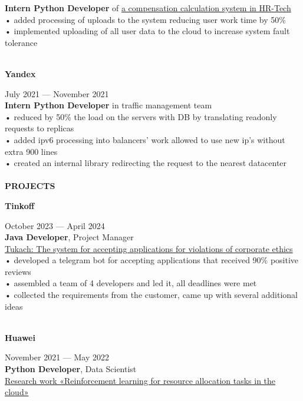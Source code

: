 \documentclass{article}
\begin{document}
\begin{vwcol}[widths={0.8,0.2},
 sep=.8cm, justify=flush,rule=0pt,indent=1em]
\textbf{Intern Python Developer} of \href{https://yandex.cloud/ru/isv/hrtech}{a compensation calculation system in HR-Tech}\\
• added processing of uploads to the system reducing user work time by 50\%\\
• implemented uploading of all user data to the cloud to increase system fault tolerance\\
\\
\begin{Large}
\textbf{Yandex}
\end{Large}
\hspace{247pt}July 2021 — November 2021\\
\textbf{Intern Python Developer} in traffic management team\\
• reduced by 50\% the load on the servers with DB by translating readonly requests to replicas\\
• added ipv6 processing into balancers’ work allowed to use new ip’s without extra 900 lines\\
• created an internal library redirecting the request to the nearest datacenter\\
\\
\noindent\textcolor[rgb]{0.1255,0.2902,0.7843}{\textbf{\Large{PROJECTS}}}\\
\begin{Large}
\textbf{Tinkoff}
\end{Large}
\hspace{257pt}October 2023 — April 2024\\
\textbf{Java Developer}, Project Manager\\
\href{https://github.com/NikPeg/TukachBot}{Tukach: The system for accepting applications for violations of corporate ethics}\\
• developed a telegram bot for accepting applications that received 90\% positive reviews\\
• assembled a team of 4 developers and led it, all deadlines were met\\
• collected the requirements from the customer, came up with several additional ideas\\
\\
\begin{Large}
\textbf{Huawei}
\end{Large}
\hspace{247pt}November 2021 — May 2022\\
\textbf{Python Developer}, Data Scientist\\
\href{https://github.com/NikPeg/Reinforcement-learning-for-resource-allocation-tasks-in-the-cloud}{Research work «Reinforcement learning for resource allocation tasks in the cloud»}\\

\end{vwcol}
\end{document}

